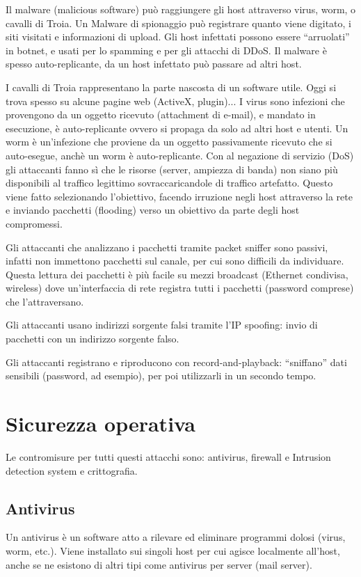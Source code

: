 Il malware (malicious software) può raggiungere gli host attraverso virus, worm, o cavalli di Troia.
Un Malware di spionaggio può registrare quanto viene digitato, i siti visitati e informazioni di upload. Gli host infettati possono essere “arruolati” in botnet, e usati per lo spamming e per gli attacchi di DDoS. Il malware è spesso auto-replicante, da un host infettato può passare ad altri host.

I cavalli di Troia rappresentano la parte nascosta di un software utile. Oggi si trova spesso su alcune pagine web (ActiveX, plugin)... I virus sono infezioni che provengono da un oggetto ricevuto
(attachment di e-mail), e mandato in esecuzione, è auto-replicante ovvero si propaga da solo ad altri host e utenti. Un worm è un'infezione che proviene da un oggetto passivamente ricevuto
che si auto-esegue, anchè un worm è auto-replicante. Con al negazione di servizio (DoS) gli attaccanti fanno sì che le risorse (server, ampiezza di banda) non siano più disponibili al traffico legittimo sovraccaricandole di traffico artefatto. Questo viene fatto selezionando l’obiettivo, facendo irruzione negli host attraverso la rete e inviando pacchetti (flooding) verso un obiettivo da parte degli host compromessi.

Gli attaccanti che analizzano i pacchetti tramite packet sniffer sono passivi, infatti non immettono pacchetti sul canale, per cui sono difficili da individuare. Questa lettura dei pacchetti è più facile su mezzi broadcast (Ethernet condivisa, wireless) dove un’interfaccia di rete registra tutti i pacchetti (password comprese) che l’attraversano.

Gli attaccanti usano indirizzi sorgente falsi tramite l'IP spoofing: invio di pacchetti con un indirizzo sorgente falso.

Gli attaccanti registrano e riproducono con record-and-playback: “sniffano” dati sensibili
(password, ad esempio), per poi utilizzarli in un secondo tempo.

\section{Sicurezza operativa}
Le contromisure per tutti questi attacchi sono: antivirus, firewall e Intrusion detection system e
crittografia.

\subsection{Antivirus}
Un antivirus è un software atto a rilevare ed eliminare programmi dolosi (virus, worm, etc.). Viene installato sui singoli host per cui agisce localmente all’host, anche se ne esistono di altri tipi come antivirus per server (mail server).

